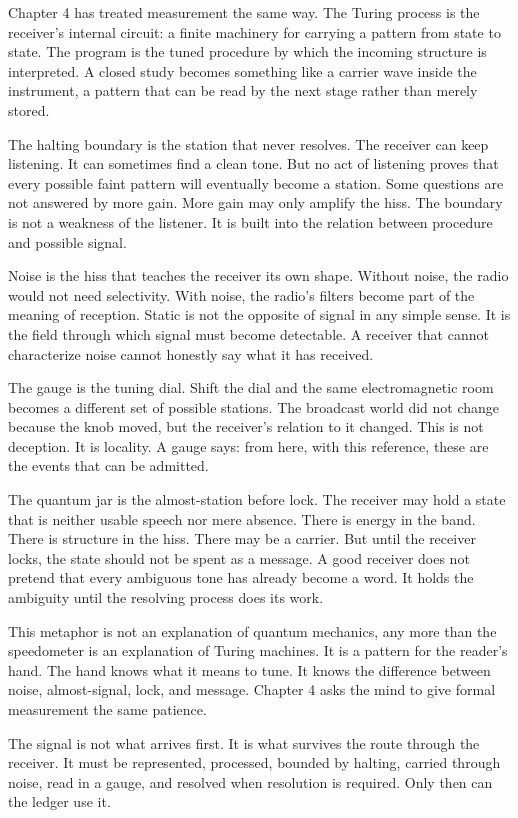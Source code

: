 Chapter 4 has treated measurement the same way. The Turing process is the
receiver's internal circuit: a finite machinery for carrying a pattern from
state to state. The program is the tuned procedure by which the incoming
structure is interpreted. A closed study becomes something like a carrier wave
inside the instrument, a pattern that can be read by the next stage rather
than merely stored.

The halting boundary is the station that never resolves. The receiver can keep
listening. It can sometimes find a clean tone. But no act of listening proves
that every possible faint pattern will eventually become a station. Some
questions are not answered by more gain. More gain may only amplify the hiss.
The boundary is not a weakness of the listener. It is built into the relation
between procedure and possible signal.

Noise is the hiss that teaches the receiver its own shape. Without noise, the
radio would not need selectivity. With noise, the radio's filters become part
of the meaning of reception. Static is not the opposite of signal in any simple
sense. It is the field through which signal must become detectable. A receiver
that cannot characterize noise cannot honestly say what it has received.

The gauge is the tuning dial. Shift the dial and the same electromagnetic room
becomes a different set of possible stations. The broadcast world did not
change because the knob moved, but the receiver's relation to it changed. This
is not deception. It is locality. A gauge says: from here, with this reference,
these are the events that can be admitted.

The quantum jar is the almost-station before lock. The receiver may hold a
state that is neither usable speech nor mere absence. There is energy in the
band. There is structure in the hiss. There may be a carrier. But until the
receiver locks, the state should not be spent as a message. A good receiver
does not pretend that every ambiguous tone has already become a word. It holds
the ambiguity until the resolving process does its work.

This metaphor is not an explanation of quantum mechanics, any more than the
speedometer is an explanation of Turing machines. It is a pattern for the
reader's hand. The hand knows what it means to tune. It knows the difference
between noise, almost-signal, lock, and message. Chapter 4 asks the mind to
give formal measurement the same patience.

The signal is not what arrives first. It is what survives the route through
the receiver. It must be represented, processed, bounded by halting, carried
through noise, read in a gauge, and resolved when resolution is required. Only
then can the ledger use it.

